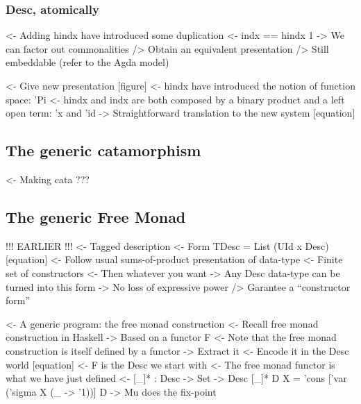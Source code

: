\documentclass{article}
\newenvironment{structure}{\footnotesize\verbatim}{\endverbatim}
\begin{document}
\subsubsection{Desc, atomically}

\begin{structure}
<- Adding hindx have introduced some duplication
    <- indx == hindx 1
    -> We can factor out commonalities 
        /> Obtain an equivalent presentation
        /> Still embeddable (refer to the Agda model)
\end{structure}

\begin{structure}
<- Give new presentation [figure]
    <- hindx have introduced the notion of function space: 'Pi
    <- hindx and indx are both composed by a binary product and a left open term: 'x and 'id 
    -> Straightforward translation to the new system [equation]
\end{structure}

\subsection{The generic catamorphism}

\begin{structure}
<- Making cata
    ???
\end{structure}

\subsection{The generic Free Monad}

\begin{structure}
!!! EARLIER !!!
<- Tagged description
    <- Form TDesc = List (UId x Desc) [equation]
    <- Follow usual sums-of-product presentation of data-type
        <- Finite set of constructors
        <- Then whatever you want
    -> Any Desc data-type can be turned into this form
        -> No loss of expressive power
        /> Garantee a ``constructor form''
\end{structure}

\begin{structure}
<- A generic program: the free monad construction
    <- Recall free monad construction in Haskell
        -> Based on a functor F
    <- Note that the free monad construction is itself defined by a functor
        -> Extract it
    <- Encode it in the Desc world [equation]
        <- F is the Desc we start with
        <- The free monad functor is what we have just defined
        <- [\_]* : Desc -> Set -> Desc
           [\_]* D X = 'cons ['var ('sigma X (\_ -> '1))] D
        -> Mu does the fix-point
\end{structure}
\end{document}
